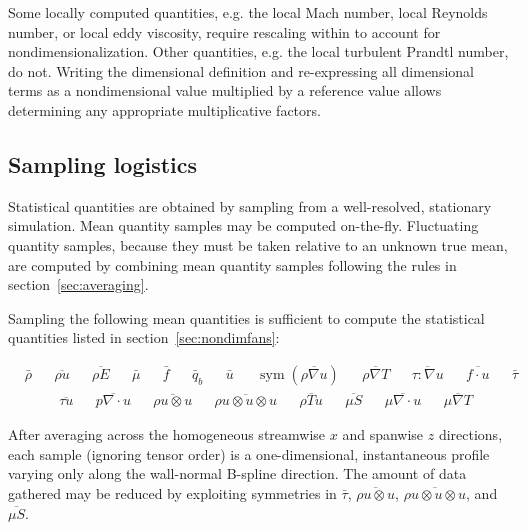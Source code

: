 \documentclass[letterpaper,11pt,nointlimits,reqno,draft]{amsart}
\newcommand{\symmetricpart}[1]
  {\ensuremath{\operatorname{sym}\left(#1\right)}}
\begin{document}
Some locally computed quantities, e.g. the local Mach number, local Reynolds
number, or local eddy viscosity, require rescaling within to account for
nondimensionalization.  Other quantities, e.g. the local turbulent Prandtl
number, do not.  Writing the dimensional definition and re-expressing all
dimensional terms as a nondimensional value multiplied by a reference value
allows determining any appropriate multiplicative factors.

\subsection{Sampling logistics}

Statistical quantities are obtained by sampling from a well-resolved,
stationary simulation.  Mean quantity samples may be computed on-the-fly.
Fluctuating quantity samples, because they must be taken relative to an unknown
true mean, are computed by combining mean quantity samples following the rules
in section~\ref{sec:averaging}.

Sampling the following mean quantities is sufficient to compute
the statistical quantities listed in section~\ref{sec:nondimfans}:
\begin{samepage}
\begin{align}
&\bar{\rho}
&
&\overline{\rho{}u}
&
&\overline{\rho{}E}
&
&\bar{\mu}
&
&\bar{f}
&
&\bar{q}_b
&
&\bar{u}
&
&\symmetricpart{\overline{\rho\nabla{}u}}
&
&\overline{\rho\nabla{}T}
&
&\overline{\tau:\nabla{}u}
&
&\overline{f\cdot{}u}
&
&\bar{\tau}
\end{align}
\begin{align}
&\overline{\tau{}u}
&
&\overline{p\nabla\cdot{}u}
&
&\overline{\rho{}u\otimes{}u}
&
&\overline{\rho{}u\otimes{}u\otimes{}u}
&
&\overline{\rho{}Tu}
&
&\overline{\mu{}S}
&
&\overline{\mu\nabla\cdot{}u}
&
&\overline{\mu\nabla{}T}
\end{align}
\end{samepage}
After averaging across the homogeneous streamwise $x$ and spanwise $z$
directions, each sample (ignoring tensor order) is a one-dimensional,
instantaneous profile varying only along the wall-normal B-spline direction.
The amount of data gathered may be reduced by exploiting symmetries in
$\bar{\tau}$, $\overline{\rho{}u\otimes{}u}$,
$\overline{\rho{}u\otimes{}u\otimes{}u}$, and $\overline{\mu{}S}$.
\end{document}
